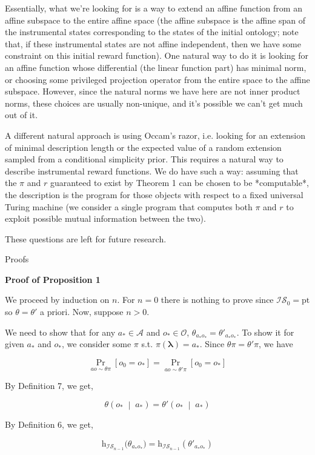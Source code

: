 \documentclass[a4paper]{article}
\newcommand{\Co}[1]{}
\newcommand{\AP}[1]{\left(#1\right)}
\newcommand{\AB}[1]{\left[#1\right]}
\newcommand{\APM}[2]{\left(#1\;\middle\vert\;#2\right)}
\newcommand{\Pa}[2]{\underset{#1}{\operatorname{Pr}}\AB{#2}}
\newcommand{\Pt}{\boldsymbol{\mathrm{pt}}}
\newcommand{\Estr}{\boldsymbol{\lambda}} %
\newcommand{\A}{\mathcal{A}}
\newcommand{\Ob}{\mathcal{O}}
\newcommand{\Ht}{\mathrm{h}}
\newcommand{\IS}{\mathcal{IS}}
\begin{document}
Essentially, what we're looking for is a way to extend an affine function from an affine subspace to the entire affine space (the affine subspace is the affine span of the instrumental states corresponding to the states of the initial ontology; note that, if these instrumental states are not affine independent, then we have some constraint on this initial reward function). One natural way to do it is looking for an affine function whose differential (the linear function part) has minimal norm, or choosing some privileged projection operator from the entire space to the affine subspace. However, since the natural norms we have here are not inner product norms, these choices are usually non-unique, and it's possible we can't get much out of it.

A different natural approach is using Occam's razor, i.e. looking for an extension of minimal description length or the expected value of a random extension sampled from a conditional simplicity prior. This requires a natural way to describe instrumental reward functions. We do have such a way: assuming that the $\pi$ and $r$ guaranteed to exist by Theorem 1 can be chosen to be *computable*, the description is the program for those objects with respect to a fixed universal Turing machine (we consider a single program that computes both $\pi$ and $r$ to exploit possible mutual information between the two).

These questions are left for future research.

\begin{Huge}Proofs\end{Huge}

\textbf{Proof of Proposition 1}\Co{b}

We proceed by induction on $n$. For $n=0$ there is nothing to prove since $\IS_0=\Pt$ so $\theta=\theta'$ a priori. Now, suppose $n>0$.

We need to show that for any $a_*\in\A$ and $o_*\in\Ob$, $\theta_{a_*o_*}=\theta'_{a_*o_*}$. To show it for given $a_*$ and $o_*$, we consider some $\pi$ s.t. $\pi(\Estr)=a_*$. Since $\theta\pi=\theta'\pi$, we have

$$\Pa{ao\sim\theta\pi}{o_0=o_*}=\Pa{ao\sim\theta'\pi}{o_0=o_*}$$

By Definition 7, we get,

$$\theta\APM{o_*}{a_*}=\theta'\APM{o_*}{a_*}$$

By Definition 6, we get,

$$\Ht_{\IS_{n-1}}\big(\theta_{a_*o_*}\big)=\Ht_{\IS_{n-1}}\AP{\theta'_{a_*o_*}}$$
\end{document}
